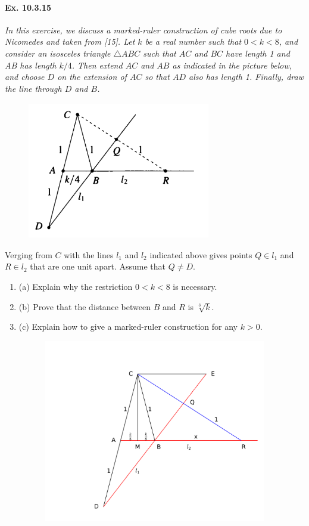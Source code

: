 \documentclass[11pt,a4paper]{article}
\newcommand{\be} {\begin{enumerate}}
\newcommand{\ee} {\end{enumerate}}
\begin{document}
\paragraph{Ex. 10.3.15}

{\it In this exercise, we discuss a marked-ruler construction of cube roots due to Nicomedes and taken from [15]. Let $k$ be a real number such that $0<k<8$, and consider an isosceles triangle $\triangle ABC$ such that $AC$ and $BC$ have length 1 and AB has length $k/4$. Then extend $AC$ and $AB$ as indicated in the picture below, and choose $D$ on the extension of $AC$ so that $AD$ also has length 1. Finally, draw the line through $D$ and $B$.

\begin{figure}[htbp]
\begin{center}
\includegraphics [width=8cm,height=6cm] {Ex_10_3_15.png}
\end{center}
\end{figure}

Verging from $C$ with the lines $l_1$ and $l_2$ indicated above gives points $Q\in l_1$ and $R \in l_2$ that are one unit apart. Assume that $Q\ne D$.
\be
\item[(a)] Explain why the restriction $0<k<8$ is necessary.
\item[(b)] Prove that the distance between $B$ and $R$ is $\sqrt[3]{k}$.
\item[(c)] Explain how to give a marked-ruler construction for any $k>0$.
\ee
}

\begin{figure}[htbp]
\begin{center}
\includegraphics[width=12cm,height=8cm]{Nicomedes.pdf}
\end{center}
\end{figure}
\end{document}
